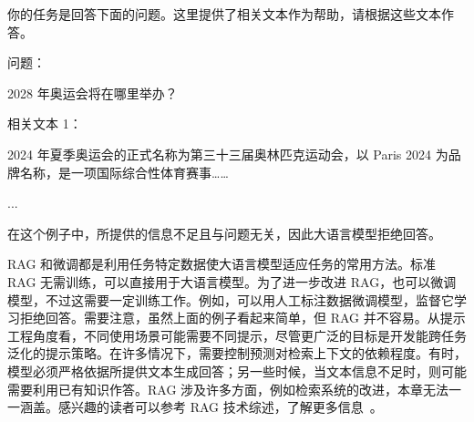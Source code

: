 \vspace{0.5em}
\begin{tcolorbox}

\begingroup
\setlength{\leftskip}{2em}
\setlength{\rightskip}{2em}

你的任务是回答下面的问题。这里提供了相关文本作为帮助，请根据这些文本作答。

\vspace{0.2em}


\vspace{0.5em}

问题：

\vspace{0.2em}

2028 年奥运会将在哪里举办？

\vspace{0.5em}

相关文本 1：

\vspace{0.2em}

2024 年夏季奥运会的正式名称为第三十三届奥林匹克运动会，以 Paris 2024 为品牌名称，是一项国际综合性体育赛事……

\vspace{0.5em}

...

\vspace{0.5em}

\underline{}

\endgroup

\end{tcolorbox}
\vspace{0.5em}

\noindent 在这个例子中，所提供的信息不足且与问题无关，因此大语言模型拒绝回答。

RAG 和微调都是利用任务特定数据使大语言模型适应任务的常用方法。标准 RAG 无需训练，可以直接用于大语言模型。为了进一步改进 RAG，也可以微调模型，不过这需要一定训练工作。例如，可以用人工标注数据微调模型，监督它学习拒绝回答。需要注意，虽然上面的例子看起来简单，但 RAG 并不容易。从提示工程角度看，不同使用场景可能需要不同提示，尽管更广泛的目标是开发能跨任务泛化的提示策略。在许多情况下，需要控制预测对检索上下文的依赖程度。有时，模型必须严格依据所提供文本生成回答；另一些时候，当文本信息不足时，则可能需要利用已有知识作答。RAG 涉及许多方面，例如检索系统的改进，本章无法一一涵盖。感兴趣的读者可以参考 RAG 技术综述，了解更多信息~\cite{li-etal:2022survey,gao-etal:2023retrieval}。

